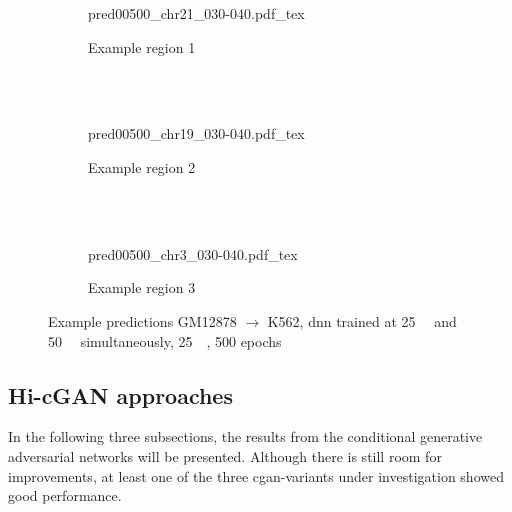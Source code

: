 \begin{figure}[p] %
    \begin{subfigure}{\textwidth}
        \centering
        \scriptsize
        {pred00500_chr21_030-040.pdf_tex}
        \caption{Example  region 1} \label{fig:results:25plus50_r1}
    \end{subfigure}\\[2mm]
    \\[3mm]
    \begin{subfigure}{\textwidth}
        \centering
        \scriptsize
        {pred00500_chr19_030-040.pdf_tex}
        \caption{Example region 2} \label{fig:results:25plus50_r2}
    \end{subfigure}\\[2mm]
    \\[3mm]
    \begin{subfigure}{\textwidth}
        \centering
        \scriptsize
        {pred00500_chr3_030-040.pdf_tex}
        \caption{Example region 3} \label{fig:results:25plus50_r3}
    \end{subfigure}
    \caption{Example predictions GM12878 $\rightarrow$ K562, \acrshort{dnn} trained at \SI{25}{\kilo\bp} and \SI{50}{\kilo\bp} simultaneously, \SI{25}{\kilo\bp}, 500 epochs}\label{fig:results:25plus50_matrices}
\end{figure}

\clearpage
\subsection{Hi-cGAN approaches} \label{sec:results:cgan}
In the following three subsections, the results from the conditional generative adversarial networks will be presented.
Although there is still room for improvements, at least one of the three \acrshort{cgan}-variants under investigation showed good performance. 

